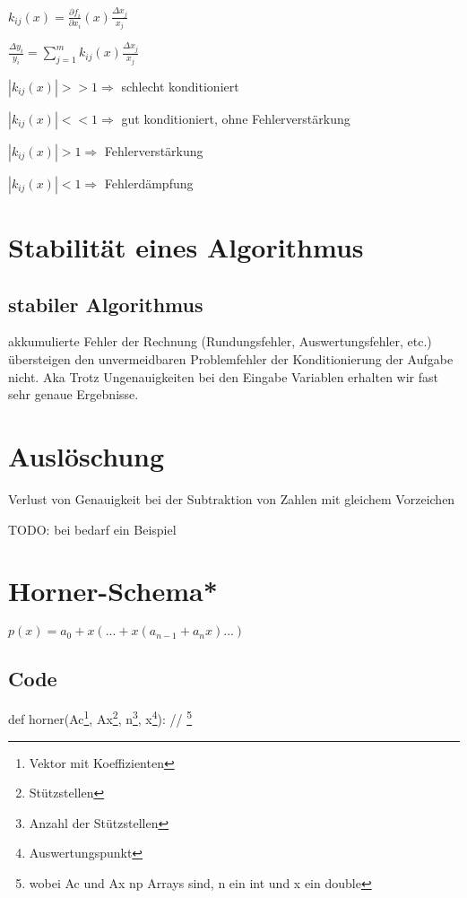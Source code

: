 \documentclass[12pt,a4paper]{article} %
\begin{document}
		$k_{ij}(x) = \frac{\partial f_i}{\partial x_i}(x) \frac{\Delta x_j}{x_j}$
		
		$\frac{\Delta y_i}{y_i} = \sum_{j = 1}^{m}k_{ij}(x)\frac{\Delta x_j}{x_j}$
		
		$|k_{ij}(x)| >> 1 \Rightarrow$ schlecht konditioniert
		
		$|k_{ij}(x)| << 1 \Rightarrow$ gut konditioniert, ohne Fehlerverstärkung
		
		$|k_{ij}(x)| > 1 \Rightarrow$ Fehlerverstärkung
		
		$|k_{ij}(x)| < 1 \Rightarrow$ Fehlerdämpfung
		
		\newpage
		
		\section{Stabilität eines Algorithmus}
		
		\subsection{stabiler Algorithmus}
		
		akkumulierte Fehler der Rechnung (Rundungsfehler, Auswertungsfehler, etc.) übersteigen den unvermeidbaren Problemfehler der Konditionierung der Aufgabe nicht. Aka Trotz Ungenauigkeiten bei den Eingabe Variablen erhalten wir fast sehr genaue Ergebnisse.
		
		\newpage
		
		\section{Auslöschung}
		
		Verlust von Genauigkeit bei der Subtraktion von Zahlen mit gleichem Vorzeichen
		
		TODO: bei bedarf ein Beispiel
		
		\newpage
		
		\section{Horner-Schema*}
		
		$p(x) = a_0 + x(... + x(a_{n-1} + a_nx)...)$
		
		\subsection{Code}
		
		def horner(Ac\footnote{Vektor mit Koeffizienten}, Ax\footnote{Stützstellen}, n\footnote{Anzahl der Stützstellen}, x\footnote{Auswertungspunkt}): // \footnote{wobei Ac und Ax np Arrays sind, n ein int und x ein double}
		
\end{document}

